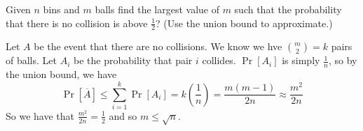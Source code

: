 \question 
Given $n$ bins and $m$ balls find the largest value of $m$ such that the probability that there is no collision is above $\frac{1}{2}$? (Use the union bound to approximate.)
    \begin{solution}[1.5 in] Let $A$ be the event that there are no collisions. We know we hve $\binom{m}{2} = k$ pairs of balls. Let $A_i$ be the probability that pair $i$ collides. $\Pr[A_i]$ is simply $\frac{1}{n}$, so by the union bound, we have 
    \[\Pr[\overline{A}] \leq \sum_{i=1}^{k} \Pr[A_i] = k \left(\frac{1}{n}\right) = \frac{m(m-1)}{2n}\approx \frac{m^2}{2n}\]
    So we have that $\frac{m^2}{2n} = \frac{1}{2}$ and so $m \leq \sqrt{n}$. 
\end{solution} 